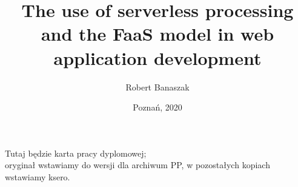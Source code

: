 \documentclass[11pt,a4paper,english,thesis]{dcsbook}
\begin{document}
\author{Robert Banaszak}
\title{The use of serverless processing and the FaaS model in web application development}
\date{Poznań, 2020}
\maketitle
\frontmatter

\thispagestyle{empty}\vspace*{\fill}%
\begin{center}Tutaj będzie karta pracy dyplomowej;\\oryginał wstawiamy do wersji dla archiwum PP, w pozostałych kopiach wstawiamy ksero.\end{center}%
\vfill\cleardoublepage%

\tableofcontents{}
\mainmatter






\backmatter

{\raggedright\sloppy\small}
\end{document}
